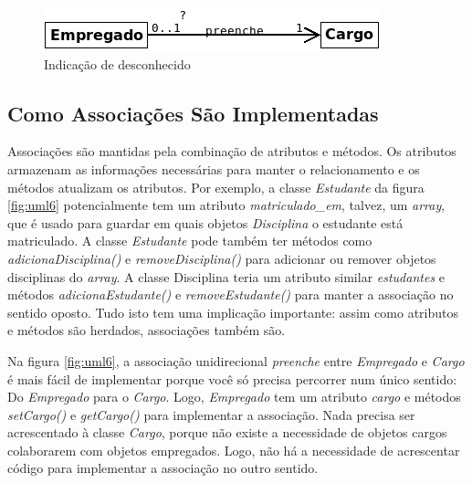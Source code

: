 \begin{figure}[h]
\begin{center}
\includegraphics[scale=0.6]{assocCls3.png} 
\caption{Indicação de desconhecido} \label{fig:uml7}
\end{center}
\end{figure}

\subsection{Como Associações São Implementadas}

Associações são mantidas pela combinação de atributos e métodos. Os atributos armazenam as informações necessárias para manter o relacionamento e os métodos atualizam os atributos. Por exemplo, a classe \emph{Estudante} da figura \ref{fig:uml6} potencialmente tem um atributo \emph{matriculado\_em}, talvez, um \textit{array}, que é usado para guardar em quais objetos \emph{Disciplina} o estudante está matriculado. A classe \emph{Estudante} pode também ter métodos como \emph{adicionaDisciplina()} e \emph{removeDisciplina()} para adicionar ou remover objetos disciplinas do \textit{array}. A classe Disciplina teria um atributo similar \emph{estudantes} e métodos \emph{adicionaEstudante()} e \emph{removeEstudante()} para manter a associação no sentido oposto. Tudo isto tem uma implicação importante: assim como atributos e métodos são herdados, associações também são.

Na figura \ref{fig:uml6}, a associação unidirecional \emph{preenche} entre \emph{Empregado} e \emph{Cargo} é mais fácil de implementar porque você só precisa percorrer num único sentido: Do \emph{Empregado} para o \emph{Cargo}. Logo, \emph{Empregado} tem um atributo \emph{cargo} e métodos \emph{setCargo()} e \emph{getCargo()} para implementar a associação. Nada precisa ser acrescentado à classe \emph{Cargo}, porque não existe a necessidade de objetos cargos colaborarem com objetos empregados. Logo, não há a necessidade de acrescentar código para implementar a associação no outro sentido.

\noindent {}

